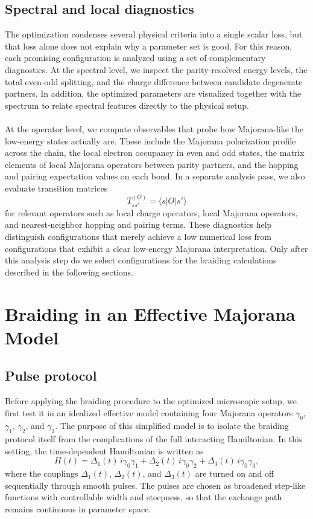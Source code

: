 \subsection{Spectral and local diagnostics}
The optimization condenses several physical criteria into a single scalar loss, but that loss alone does not explain why a parameter set is good. For this reason, each promising configuration is analyzed using a set of complementary diagnostics. At the spectral level, we inspect the parity-resolved energy levels, the total even-odd splitting, and the charge difference between candidate degenerate partners. In addition, the optimized parameters are visualized together with the spectrum to relate spectral features directly to the physical setup. \\ \\
At the operator level, we compute observables that probe how Majorana-like the low-energy states actually are. These include the Majorana polarization profile across the chain, the local electron occupancy in even and odd states, the matrix elements of local Majorana operators between parity partners, and the hopping and pairing expectation values on each bond. In a separate analysis pass, we also evaluate transition matrices
\[
T_{ss'}^{(O)} = \langle s \vert O \vert s' \rangle
\]
for relevant operators such as local charge operators, local Majorana operators, and nearest-neighbor hopping and pairing terms. These diagnostics help distinguish configurations that merely achieve a low numerical loss from configurations that exhibit a clear low-energy Majorana interpretation. Only after this analysis step do we select configurations for the braiding calculations described in the following sections.

\section{Braiding in an Effective Majorana Model}
\subsection{Pulse protocol}
Before applying the braiding procedure to the optimized microscopic setup, we first test it in an idealized effective model containing four Majorana operators $γ_0$, $γ_1$, $γ_2$, and $γ_3$. The purpose of this simplified model is to isolate the braiding protocol itself from the complications of the full interacting Hamiltonian. In this setting, the time-dependent Hamiltonian is written as
\[
H(t) = \Delta_1(t)\, i γ_0 γ_1 + \Delta_2(t)\, i γ_0 γ_2 + \Delta_3(t)\, i γ_0 γ_3,
\]
where the couplings $\Delta_1(t)$, $\Delta_2(t)$, and $\Delta_3(t)$ are turned on and off sequentially through smooth pulses. The pulses are chosen as broadened step-like functions with controllable width and steepness, so that the exchange path remains continuous in parameter space.

